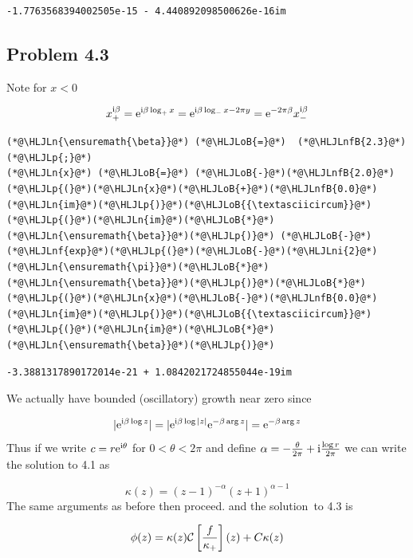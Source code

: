 \documentclass[12pt,a4paper]{article}
\newcommand{\HLJLn}[1]{#1}
\newcommand{\HLJLnf}[1]{\textcolor[RGB]{66,102,213}{#1}}
\newcommand{\HLJLnfB}[1]{\textcolor[RGB]{59,151,46}{#1}}
\newcommand{\HLJLni}[1]{\textcolor[RGB]{59,151,46}{#1}}
\newcommand{\HLJLoB}[1]{\textcolor[RGB]{102,102,102}{\textbf{#1}}}
\newcommand{\HLJLp}[1]{#1}
\def\I{ {\rm i} }
\def\E{ {\rm e} }
\def\CC{ {\cal C} }
\def\br[#1]{\left[{#1}\right]}
\begin{document}
\begin{lstlisting}
-1.7763568394002505e-15 - 4.440892098500626e-16im
\end{lstlisting}


\subsection{Problem 4.3}
Note for $x < 0$

\[
x_+^{\I \beta} = \E^{\I \beta \log_+ x} = \E^{\I \beta \log_- x - 2\pi y} = \E^{-2 \pi \beta} x_-^{\I \beta}
\]

\begin{lstlisting}
(*@\HLJLn{\ensuremath{\beta}}@*) (*@\HLJLoB{=}@*)  (*@\HLJLnfB{2.3}@*)(*@\HLJLp{;}@*)
(*@\HLJLn{x}@*) (*@\HLJLoB{=}@*) (*@\HLJLoB{-}@*)(*@\HLJLnfB{2.0}@*)
(*@\HLJLp{(}@*)(*@\HLJLn{x}@*)(*@\HLJLoB{+}@*)(*@\HLJLnfB{0.0}@*)(*@\HLJLn{im}@*)(*@\HLJLp{)}@*)(*@\HLJLoB{{\textasciicircum}}@*)(*@\HLJLp{(}@*)(*@\HLJLn{im}@*)(*@\HLJLoB{*}@*)(*@\HLJLn{\ensuremath{\beta}}@*)(*@\HLJLp{)}@*) (*@\HLJLoB{-}@*) (*@\HLJLnf{exp}@*)(*@\HLJLp{(}@*)(*@\HLJLoB{-}@*)(*@\HLJLni{2}@*)(*@\HLJLn{\ensuremath{\pi}}@*)(*@\HLJLoB{*}@*)(*@\HLJLn{\ensuremath{\beta}}@*)(*@\HLJLp{)}@*)(*@\HLJLoB{*}@*)(*@\HLJLp{(}@*)(*@\HLJLn{x}@*)(*@\HLJLoB{-}@*)(*@\HLJLnfB{0.0}@*)(*@\HLJLn{im}@*)(*@\HLJLp{)}@*)(*@\HLJLoB{{\textasciicircum}}@*)(*@\HLJLp{(}@*)(*@\HLJLn{im}@*)(*@\HLJLoB{*}@*)(*@\HLJLn{\ensuremath{\beta}}@*)(*@\HLJLp{)}@*)
\end{lstlisting}

\begin{lstlisting}
-3.3881317890172014e-21 + 1.0842021724855044e-19im
\end{lstlisting}


We actually have bounded (oscillatory) growth near zero since 

\[
|\E^{\I \beta \log z}| = |\E^{\I \beta \log |z|} \E^{-\beta \arg z}| = \E^{-\beta \arg z}
\]
Thus if we write $c = r \E^{\I \theta}$ for $0 < \theta < 2 \pi$ and define $\alpha = -{\theta \over 2 \pi} + \I{\log r \over 2 \pi}$ we can write the solution to 4.1 as

\[
\kappa(z) = (z-1)^{-\alpha} (z+1)^{\alpha-1}
\]
The same arguments as before then proceed. and the solution to 4.3 is 

\[
\phi(z) = \kappa(z) \CC\br[{f \over \kappa_+}](z)+ C \kappa(z)
\]
\end{document}
